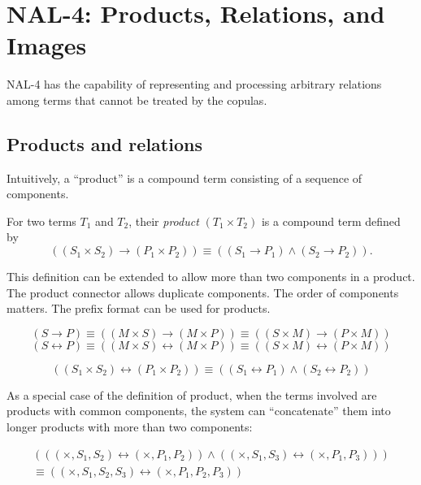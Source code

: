 \chapter{NAL-4: Products, Relations, and Images}

NAL-4 has the capability of representing and processing arbitrary relations among terms that cannot be treated by the copulas.

\section{Products and relations}

Intuitively, a ``product'' is a compound term consisting of a sequence of components.
\begin{defi}
For two terms $T_1$ and $T_2$, their {\em product} \((T_1 \times T_2)\) is a compound term defined by 
\[((S_1 \times S_2) \rightarrow (P_1 \times P_2)) \equiv ((S_1 \rightarrow P_1) \wedge (S_2 \rightarrow P_2)).\]
\end{defi}
This definition can be extended to allow more than two components in a product.  The product connector allows duplicate components.  The order of components matters. The prefix format can be used for products.

\begin{theo}
\[(S \rightarrow P) \equiv
  ((M \times S) \rightarrow (M \times P)) \equiv
  ((S \times M) \rightarrow (P \times M))\]
\[(S \leftrightarrow P) \equiv
  ((M \times S) \leftrightarrow (M \times P)) \equiv
  ((S \times M) \leftrightarrow (P \times M))\]
\end{theo}
\begin{theo}
\[((S_1 \times S_2) \leftrightarrow (P_1 \times P_2)) \equiv
((S_1 \leftrightarrow P_1) \wedge (S_2 \leftrightarrow P_2))\]
\end{theo}

As a special case of the definition of product, when the terms involved are products with common components, the system can ``concatenate'' them into longer products with more than two components:
\begin{theo}
\[\begin{array}{c}
(((\times, S_1, S_2) \leftrightarrow (\times, P_1, P_2)) \wedge ((\times, S_1, S_3) \leftrightarrow (\times, P_1, P_3))) 
\\ \equiv ((\times, S_1, S_2, S_3) \leftrightarrow (\times, P_1, P_2, P_3))
\end{array}\]
\end{theo}


